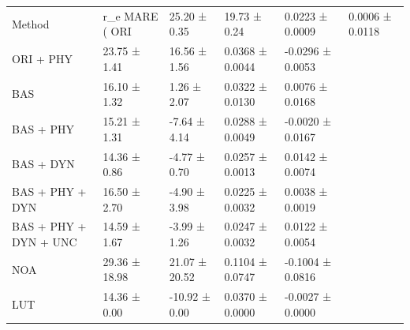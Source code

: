 \begin{tabular}{lllll}
\toprule
Method & r_e MARE (%
\midrule
ORI & 25.20 ± 0.35 & 19.73 ± 0.24 & 0.0223 ± 0.0009 & 0.0006 ± 0.0118 \\
ORI + PHY & 23.75 ± 1.41 & 16.56 ± 1.56 & 0.0368 ± 0.0044 & -0.0296 ± 0.0053 \\
BAS & 16.10 ± 1.32 & 1.26 ± 2.07 & 0.0322 ± 0.0130 & 0.0076 ± 0.0168 \\
BAS + PHY & 15.21 ± 1.31 & -7.64 ± 4.14 & 0.0288 ± 0.0049 & -0.0020 ± 0.0167 \\
BAS + DYN & 14.36 ± 0.86 & -4.77 ± 0.70 & 0.0257 ± 0.0013 & 0.0142 ± 0.0074 \\
BAS + PHY + DYN & 16.50 ± 2.70 & -4.90 ± 3.98 & 0.0225 ± 0.0032 & 0.0038 ± 0.0019 \\
BAS + PHY + DYN + UNC & 14.59 ± 1.67 & -3.99 ± 1.26 & 0.0247 ± 0.0032 & 0.0122 ± 0.0054 \\
NOA & 29.36 ± 18.98 & 21.07 ± 20.52 & 0.1104 ± 0.0747 & -0.1004 ± 0.0816 \\
LUT & 14.36 ± 0.00 & -10.92 ± 0.00 & 0.0370 ± 0.0000 & -0.0027 ± 0.0000 \\
\bottomrule
\end{tabular}

